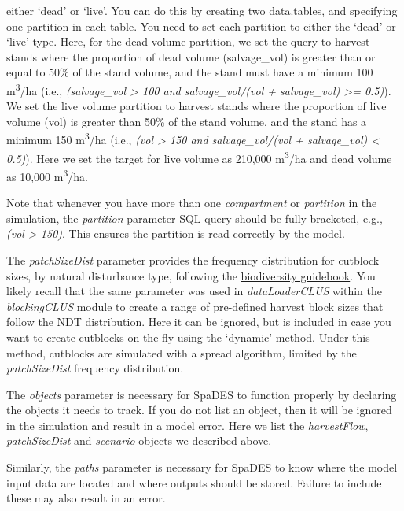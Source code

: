 \documentclass[
]{article}
\begin{document}
either `dead' or `live'. You can do this by creating two data.tables,
and specifying one partition in each table. You need to set each
partition to either the `dead' or `live' type. Here, for the dead volume
partition, we set the query to harvest stands where the proportion of
dead volume (salvage\_vol) is greater than or equal to 50\% of the stand
volume, and the stand must have a minimum 100 m\textsuperscript{3}/ha
(i.e., \emph{(salvage\_vol \textgreater{} 100 and salvage\_vol/(vol +
salvage\_vol) \textgreater= 0.5)}). We set the live volume partition to
harvest stands where the proportion of live volume (vol) is greater than
50\% of the stand volume, and the stand has a minimum 150
m\textsuperscript{3}/ha (i.e., \emph{(vol \textgreater{} 150 and
salvage\_vol/(vol + salvage\_vol) \textless{} 0.5)}). Here we set the
target for live volume as 210,000 m\textsuperscript{3}/ha and dead
volume as 10,000 m\textsuperscript{3}/ha.

Note that whenever you have more than one \emph{compartment} or
\emph{partition} in the simulation, the \emph{partition} parameter SQL
query should be fully bracketed, e.g., \emph{(vol \textgreater{} 150)}.
This ensures the partition is read correctly by the model.

The \emph{patchSizeDist} parameter provides the frequency distribution
for cutblock sizes, by natural disturbance type, following the
\href{https://www.for.gov.bc.ca/hfd/library/documents/bib19715.pdf}{biodiversity
guidebook}. You likely recall that the same parameter was used in
\emph{dataLoaderCLUS} within the \emph{blockingCLUS} module to create a
range of pre-defined harvest block sizes that follow the NDT
distribution. Here it can be ignored, but is included in case you want
to create cutblocks on-the-fly using the `dynamic' method. Under this
method, cutblocks are simulated with a spread algorithm, limited by the
\emph{patchSizeDist} frequency distribution.

The \emph{objects} parameter is necessary for SpaDES to function
properly by declaring the objects it needs to track. If you do not list
an object, then it will be ignored in the simulation and result in a
model error. Here we list the \emph{harvestFlow}, \emph{patchSizeDist}
and \emph{scenario} objects we described above.

Similarly, the \emph{paths} parameter is necessary for SpaDES to know
where the model input data are located and where outputs should be
stored. Failure to include these may also result in an error.
\end{document}
